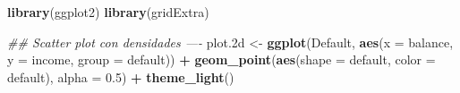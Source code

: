 \documentclass[]{book}
\newenvironment{Shaded}{\begin{snugshade}}{\end{snugshade}}
\newcommand{\CommentTok}[1]{\textcolor[rgb]{0.56,0.35,0.01}{\textit{#1}}}
\newcommand{\DataTypeTok}[1]{\textcolor[rgb]{0.13,0.29,0.53}{#1}}
\newcommand{\FloatTok}[1]{\textcolor[rgb]{0.00,0.00,0.81}{#1}}
\newcommand{\KeywordTok}[1]{\textcolor[rgb]{0.13,0.29,0.53}{\textbf{#1}}}
\newcommand{\NormalTok}[1]{#1}
\newcommand{\OperatorTok}[1]{\textcolor[rgb]{0.81,0.36,0.00}{\textbf{#1}}}
\newcommand{\StringTok}[1]{\textcolor[rgb]{0.31,0.60,0.02}{#1}}
\begin{document}
\begin{Shaded}
\begin{Highlighting}[]
\KeywordTok{library}\NormalTok{(ggplot2)}
\KeywordTok{library}\NormalTok{(gridExtra)}

\CommentTok{## Scatter plot con densidades ----}
\NormalTok{plot}\FloatTok{.2}\NormalTok{d <-}\StringTok{ }\KeywordTok{ggplot}\NormalTok{(Default, }\KeywordTok{aes}\NormalTok{(}\DataTypeTok{x =}\NormalTok{ balance, }\DataTypeTok{y =}\NormalTok{ income, }\DataTypeTok{group =}\NormalTok{ default)) }\OperatorTok{+}
\StringTok{  }\KeywordTok{geom_point}\NormalTok{(}\KeywordTok{aes}\NormalTok{(}\DataTypeTok{shape =}\NormalTok{ default, }\DataTypeTok{color =}\NormalTok{ default), }\DataTypeTok{alpha =} \FloatTok{0.5}\NormalTok{) }\OperatorTok{+}
\StringTok{  }\KeywordTok{theme_light}\NormalTok{()}


\end{Highlighting}
\end{Shaded}
\end{document}
